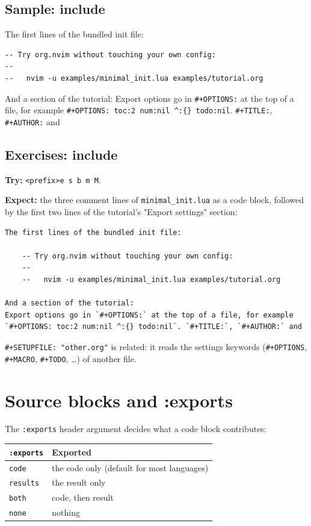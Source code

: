 \subsection{Sample: include}
\label{sec:org595b447}
The first lines of the bundled init file:
\begin{verbatim}
-- Try org.nvim without touching your own config:
--
--   nvim -u examples/minimal_init.lua examples/tutorial.org
\end{verbatim}
And a section of the tutorial:
Export options go in \texttt{\#+OPTIONS:} at the top of a file, for example
\texttt{\#+OPTIONS: toc:2 num:nil \textasciicircum{}:\{\} todo:nil}. \texttt{\#+TITLE:}, \texttt{\#+AUTHOR:} and
\subsection{Exercises: include}
\label{sec:org7d98593}
\textbf{Try:} \texttt{<prefix>e s b m M}.

\textbf{Expect:} the three comment lines of \texttt{minimal\_init.lua} as a code block,
followed by the first two lines of the tutorial's "Export settings"
section:

\begin{verbatim}
The first lines of the bundled init file:

    -- Try org.nvim without touching your own config:
    --
    --   nvim -u examples/minimal_init.lua examples/tutorial.org

And a section of the tutorial:
Export options go in `#+OPTIONS:` at the top of a file, for example
`#+OPTIONS: toc:2 num:nil ^:{} todo:nil`. `#+TITLE:`, `#+AUTHOR:` and
\end{verbatim}

\texttt{\#+SETUPFILE: "other.org"} is related: it reads the settings keywords
(\texttt{\#+OPTIONS}, \texttt{\#+MACRO}, \texttt{\#+TODO}, \ldots{}) of another file.
\section{Source blocks and :exports}
\label{sec:orgb998a8e}
The \texttt{:exports} header argument decides what a code block contributes:
\begin{center}
\begin{tabular}{ll}
\texttt{:exports} & Exported\\
\hline
\texttt{code} & the code only (default for most languages)\\
\texttt{results} & the result only\\
\texttt{both} & code, then result\\
\texttt{none} & nothing\\
\end{tabular}
\end{center}

